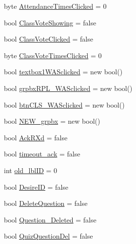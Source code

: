 \begin{DoxyCompactItemize}
\item 
byte \hyperlink{class_sr_p___classroom_inq_1_1frm_classrrom_inq_ade18c1a241b76944c2731681e1767652}{\-Attendance\-Times\-Clicked} = 0
\item 
bool \hyperlink{class_sr_p___classroom_inq_1_1frm_classrrom_inq_ae23aa3324c19688aa8d35b0217cf9605}{\-Class\-Vote\-Showing} = false
\item 
bool \hyperlink{class_sr_p___classroom_inq_1_1frm_classrrom_inq_a1e2c8341b4d2988c61648bea9a4c412b}{\-Class\-Vote\-Clicked} = false
\item 
byte \hyperlink{class_sr_p___classroom_inq_1_1frm_classrrom_inq_ab63c943c019363dba6aa86686b9f2bf6}{\-Class\-Vote\-Times\-Clicked} = 0
\item 
bool \hyperlink{class_sr_p___classroom_inq_1_1frm_classrrom_inq_a998e499144884577e3445f4b721b4c6a}{textbox1\-W\-A\-Sclicked} = new bool()
\item 
bool \hyperlink{class_sr_p___classroom_inq_1_1frm_classrrom_inq_a97ab9f8512cd6b2f9648651d5c5d404b}{grpbx\-R\-P\-L\-\_\-\-W\-A\-Sclicked} = new bool()
\item 
bool \hyperlink{class_sr_p___classroom_inq_1_1frm_classrrom_inq_aed9d1ad7c4e2b196997c1820ac2cdb4d}{btn\-C\-L\-S\-\_\-\-W\-A\-Sclicked} = new bool()
\item 
bool \hyperlink{class_sr_p___classroom_inq_1_1frm_classrrom_inq_aaf5a152b29ae06c11e8e25f0eabf454d}{\-N\-E\-W\-\_\-grpbx} = new bool()
\item 
bool \hyperlink{class_sr_p___classroom_inq_1_1frm_classrrom_inq_a65b6633a5bc7bff8142fcace6bfba3f8}{\-Ack\-R\-Xd} = false
\item 
bool \hyperlink{class_sr_p___classroom_inq_1_1frm_classrrom_inq_a64cde7d8ac96b5122de783724c58103a}{timeout\-\_\-ack} = false
\item 
int \hyperlink{class_sr_p___classroom_inq_1_1frm_classrrom_inq_ac56e0f039ce0113331d9bdd322b30827}{old\-\_\-lbl\-I\-D} = 0
\item 
bool \hyperlink{class_sr_p___classroom_inq_1_1frm_classrrom_inq_aad36cc9a93fb79969dd3b0d0fe52b793}{\-Desire\-I\-D} = false
\item 
bool \hyperlink{class_sr_p___classroom_inq_1_1frm_classrrom_inq_ab3a8803fac827da5757e7451c1836010}{\-Delete\-Question} = false
\item 
bool \hyperlink{class_sr_p___classroom_inq_1_1frm_classrrom_inq_a8f54ae3a0ea7bb9dafed984a53155fd8}{\-Question\-\_\-\-Deleted} = false
\item 
bool \hyperlink{class_sr_p___classroom_inq_1_1frm_classrrom_inq_aa1c6ba1dda756081aba5b3cfea87b09d}{\-Quiz\-Question\-Del} = false

\end{DoxyCompactItemize}
